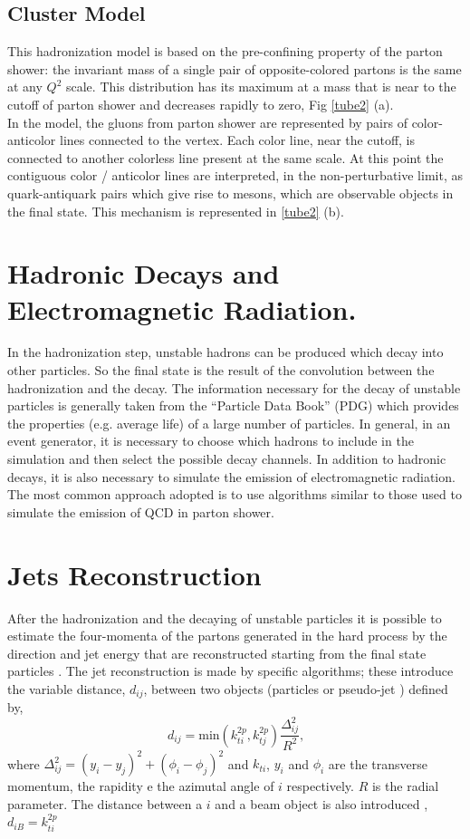\subsection*{Cluster Model}  This  hadronization model  is based on the pre-confining property of the parton shower: the invariant mass of a single pair of opposite-colored partons is the same at any $ Q^2 $ scale. This distribution has its maximum at a mass that is near to the cutoff of parton shower and decreases rapidly to zero, Fig \ref{tube2} (a). \\
In the model, the gluons from parton shower are represented by pairs of color-anticolor lines connected to the vertex. Each color line, near the cutoff, is connected to another colorless line present at the same scale. At this point the contiguous color / anticolor lines are interpreted, in the non-perturbative limit, as quark-antiquark pairs which give rise to mesons, which are observable objects in the final state.
This mechanism is represented in \ref{tube2} (b).

\section{Hadronic Decays and  Electromagnetic   Radiation.}
In the hadronization step, unstable hadrons can be produced which decay into other particles. So the final state  is the result of the convolution between the  hadronization  and the decay. The information necessary for the decay of unstable particles  is generally taken from the  ``Particle Data Book'' (PDG) \cite{bib: pdg} which provides the properties (e.g. average life) of a large number of particles.
In general, in an event generator, it is necessary to choose which hadrons to include in the simulation and then select the possible decay channels. In addition to hadronic decays, it is also necessary to simulate the emission of electromagnetic radiation. The most common approach adopted is to use algorithms similar to those used to simulate the emission of QCD in parton shower.

\section{Jets Reconstruction} 
\label{rico_jet}
After the  hadronization and the decaying of  unstable particles it is possible to estimate the four-momenta of the partons generated in the hard process by the direction and jet energy  that are reconstructed starting from the final state particles  \cite{bib: run2jet, mass: in: dijet}.
The jet reconstruction  is made by specific algorithms; these introduce the variable distance, $ d_ {ij} $, between two objects (particles or pseudo-jet ) defined by,
\begin{equation}
d_{ij}=\mbox{min}( k_{ti}^{2p}, k_{tj}^{2p})  \frac{\Delta_{ij}^2}{R^2} \mbox{,}\end{equation}
where $\Delta_{ij}^2=(y_i - y_j)^2+ (\phi_i - \phi_j)^2$ and $k_{ti}$, $y_i$ and $\phi_i$ are  the transverse momentum, the rapidity  e the azimutal angle of $i$ respectively.  $R$ is the radial parameter. The distance between a $ i $ and a beam object is also introduced , $d_{iB}=k_{ti}^{2p}$ \\

